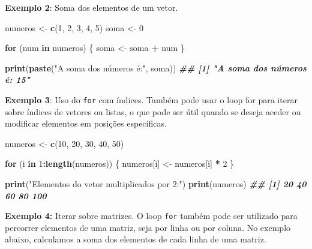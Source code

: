 \documentclass[
]{book}
\newenvironment{Shaded}{\begin{snugshade}}{\end{snugshade}}
\newcommand{\ControlFlowTok}[1]{\textcolor[rgb]{0.13,0.29,0.53}{\textbf{#1}}}
\newcommand{\DecValTok}[1]{\textcolor[rgb]{0.00,0.00,0.81}{#1}}
\newcommand{\DocumentationTok}[1]{\textcolor[rgb]{0.56,0.35,0.01}{\textbf{\textit{#1}}}}
\newcommand{\FunctionTok}[1]{\textcolor[rgb]{0.13,0.29,0.53}{\textbf{#1}}}
\newcommand{\NormalTok}[1]{#1}
\newcommand{\OtherTok}[1]{\textcolor[rgb]{0.56,0.35,0.01}{#1}}
\newcommand{\SpecialCharTok}[1]{\textcolor[rgb]{0.81,0.36,0.00}{\textbf{#1}}}
\newcommand{\StringTok}[1]{\textcolor[rgb]{0.31,0.60,0.02}{#1}}
\begin{document}
\textbf{Exemplo 2}: Soma dos elementos de um vetor.

\begin{Shaded}
\begin{Highlighting}[]
\NormalTok{numeros }\OtherTok{\textless{}{-}} \FunctionTok{c}\NormalTok{(}\DecValTok{1}\NormalTok{, }\DecValTok{2}\NormalTok{, }\DecValTok{3}\NormalTok{, }\DecValTok{4}\NormalTok{, }\DecValTok{5}\NormalTok{)}
\NormalTok{soma }\OtherTok{\textless{}{-}} \DecValTok{0}

\ControlFlowTok{for}\NormalTok{ (num }\ControlFlowTok{in}\NormalTok{ numeros) \{}
\NormalTok{  soma }\OtherTok{\textless{}{-}}\NormalTok{ soma }\SpecialCharTok{+}\NormalTok{ num}
\NormalTok{\}}

\FunctionTok{print}\NormalTok{(}\FunctionTok{paste}\NormalTok{(}\StringTok{"A soma dos números é:"}\NormalTok{, soma))}
\DocumentationTok{\#\# [1] "A soma dos números é: 15"}
\end{Highlighting}
\end{Shaded}

\textbf{Exemplo 3}: Uso do \texttt{for} com índices. Também pode usar o loop for
para iterar sobre índices de vetores ou listas, o que pode ser útil
quando se deseja aceder ou modificar elementos em posições específicas.

\begin{Shaded}
\begin{Highlighting}[]
\NormalTok{numeros }\OtherTok{\textless{}{-}} \FunctionTok{c}\NormalTok{(}\DecValTok{10}\NormalTok{, }\DecValTok{20}\NormalTok{, }\DecValTok{30}\NormalTok{, }\DecValTok{40}\NormalTok{, }\DecValTok{50}\NormalTok{)}

\ControlFlowTok{for}\NormalTok{ (i }\ControlFlowTok{in} \DecValTok{1}\SpecialCharTok{:}\FunctionTok{length}\NormalTok{(numeros)) \{}
\NormalTok{  numeros[i] }\OtherTok{\textless{}{-}}\NormalTok{ numeros[i] }\SpecialCharTok{*} \DecValTok{2}
\NormalTok{\}}

\FunctionTok{print}\NormalTok{(}\StringTok{"Elementos do vetor multiplicados por 2:"}\NormalTok{)}
\FunctionTok{print}\NormalTok{(numeros)}
\DocumentationTok{\#\# [1]  20  40  60  80 100}
\end{Highlighting}
\end{Shaded}

\textbf{Exemplo 4:} Iterar sobre matrizes. O loop \texttt{for} também pode ser
utilizado para percorrer elementos de uma matriz, seja por linha ou por
coluna. No exemplo abaixo, calculamos a soma dos elementos de cada linha
de uma matriz.
\end{document}
